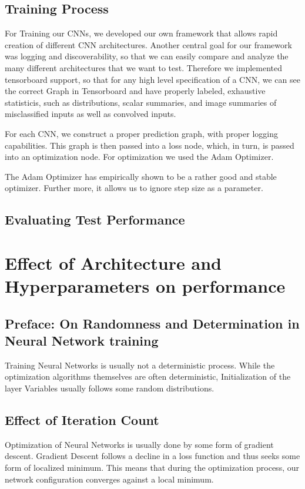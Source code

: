 \documentclass{article}
\begin{document}
\subsection{Training Process}

For Training our CNNs, we developed our own framework that allows rapid creation of different CNN architectures. Another central goal for our framework was logging and discoverability, so that we can easily compare and analyze the many different architectures that we want to test. Therefore we implemented tensorboard support, so that for any high level specification of a CNN, we can see the correct Graph in Tensorboard and have properly labeled, exhaustive statisticis, such as distributions, scalar summaries, and image summaries of misclassified inputs as well as convolved inputs.

For each CNN, we construct a proper prediction graph, with proper logging capabilities. This graph is then passed into a loss node, which, in turn, is passed into an optimization node. For optimization we used the Adam Optimizer.

The Adam Optimizer has empirically shown to be a rather good and stable optimizer. Further more, it allows us to ignore step size as a parameter.
\subsection{Evaluating Test Performance}



\section{Effect of Architecture and Hyperparameters on performance}

\subsection{Preface: On Randomness and Determination in Neural Network training}
Training Neural Networks is usually not a deterministic process. While the optimization algorithms themselves are often deterministic, Initialization of the layer Variables usually follows some random distributions.


\subsection{Effect of Iteration Count}
Optimization of Neural Networks is usually done by some form of gradient descent. Gradient Descent follows a decline in a loss function and thus seeks some form of localized minimum. This means that during the optimization process, our network configuration converges against a local minimum.
\end{document}
